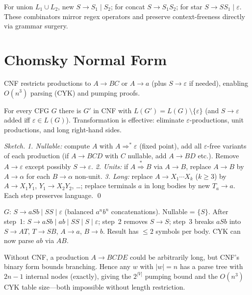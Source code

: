 \begin{remark}
For union $L_1\cup L_2$, new $S\to S_1\mid S_2$; for concat $S\to S_1S_2$; for star $S\to SS_1\mid\varepsilon$. These combinators mirror regex operators and preserve context-freeness directly via grammar surgery.
\end{remark}

\section{Chomsky Normal Form}
\label{sec:cnf}
CNF restricts productions to $A\to BC$ or $A\to a$ (plus $S\to\varepsilon$ if needed), enabling $O(n^3)$ parsing (CYK) and pumping proofs.

\begin{theorem}
For every CFG $G$ there is $G'$ in CNF with $L(G')=L(G)\setminus\{\varepsilon\}$ (and $S\to\varepsilon$ added iff $\varepsilon\in L(G)$). Transformation is effective: eliminate $\varepsilon$-productions, unit productions, and long right-hand sides.
\end{theorem}
\begin{proof}[Sketch]
\emph{1. Nullable:} compute $A$ with $A\Rightarrow^*\varepsilon$ (fixed point), add all $\varepsilon$-free variants of each production (if $A\to BCD$ with $C$ nullable, add $A\to BD$ etc.). Remove $A\to\varepsilon$ except possibly $S\to\varepsilon$. \emph{2. Units:} if $A\stackrel{*}{\Rightarrow}B$ via $A\to B$, replace $A\to B$ by $A\to\alpha$ for each $B\to\alpha$ non-unit. \emph{3. Long:} replace $A\to X_1\cdots X_k$ ($k\ge3$) by $A\to X_1Y_1$, $Y_1\to X_2Y_2$, \dots; replace terminals $a$ in long bodies by new $T_a\to a$. Each step preserves language. \qed
\end{proof}

\begin{example}
$G$: $S\to aSb\mid SS\mid\varepsilon$ (balanced $a^nb^n$ concatenations). Nullable = $\{S\}$. After step~1: $S\to aSb\mid ab\mid SS\mid S\mid\varepsilon$; step~2 removes $S\to S$; step~3 breaks $aSb$ into $S\to AT$, $T\to SB$, $A\to a$, $B\to b$. Result has $\le2$ symbols per body. CYK can now parse $ab$ via $A B$.
\end{example}

\begin{example}
Without CNF, a production $A\to B C D E$ could be arbitrarily long, but CNF's binary form bounds branching. Hence any $w$ with $|w|=n$ has a parse tree with $2n-1$ internal nodes (exactly), giving the $2^{|V|}$ pumping bound and the $O(n^3)$ CYK table size---both impossible without length restriction.
\end{example}

